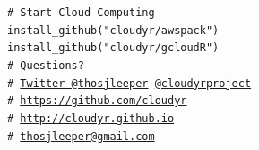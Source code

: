 \documentclass[14pt]{beamer}
\begin{document}
\bgroup
{}
\begin{frame}
    \vspace{1em}
    {\color{white}\texttt{\noindent \# Start Cloud Computing\\
    \vspace{1.5em}
    install\_github("cloudyr/awspack")\\
    install\_github("cloudyr/gcloudR")\\
    \vspace{1.5em}
    \# Questions?\\
    \# \href{https://twitter.com/thosjleeper}{Twitter @thosjleeper} \href{https://twitter.com/cloudyrproject}{@cloudyrproject}\\
    \# \url{https://github.com/cloudyr}\\
    \# \url{http://cloudyr.github.io}\\
    \# \href{mailto:thosjleeper@gmail.com}{thosjleeper@gmail.com}
    }}
\end{frame}
\egroup


\bgroup
{}
\frame{}
\egroup
\end{document}
